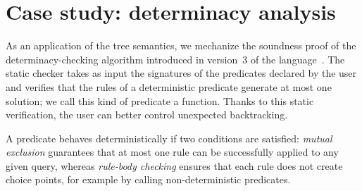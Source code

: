 \documentclass[sigplan,10pt,anonymous,review]{acmart}
\begin{document}




\section{Case study: determinacy analysis}\label{sec:determinacy}

As an application of the tree semantics, we mechanize the soundness proof
of the determinacy-checking algorithm introduced in version~3 of the
\elpiP{} language~\cite{fissore2026}. The static checker takes as input
the signatures of the predicates declared by the user and verifies that
the rules of a deterministic predicate generate at most one solution; we
call this kind of predicate a function. Thanks to this static
verification, the user can better control unexpected backtracking.

A predicate behaves deterministically if two conditions are
satisfied: \emph{mutual exclusion} guarantees that at most one rule can
be successfully applied to any given query, whereas \emph{rule-body checking}
ensures that each rule does not create choice points, for example by
calling non-deterministic predicates.
\end{document}
